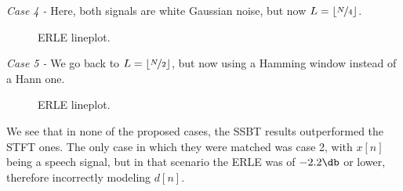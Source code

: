 \noindent\textit{Case 4 -} Here, both signals are white Gaussian noise, but now $L = \left\lfloor \nicefrac{N}{4} \right\rfloor$.

\begin{figure}[H]
	\centering
	
	\caption{ERLE lineplot.}
	\label{fig:sec4:lineplot_erle_case4}
\end{figure}

\noindent\textit{Case 5 -} We go back to $L = \left\lfloor \nicefrac{N}{2} \right\rfloor$, but now using a Hamming window instead of a Hann one.

\begin{figure}[H]
	\centering
	
	\caption{ERLE lineplot.}
	\label{fig:sec4:lineplot_erle_case5}
\end{figure}

We see that in none of the proposed cases, the SSBT results outperformed the STFT ones. The only case in which they were matched was case 2, with $x[n]$ being a speech signal, but in that scenario the ERLE was of $-2.2\db$ or lower, therefore incorrectly modeling $d[n]$.

%
%	
%
%
%	
